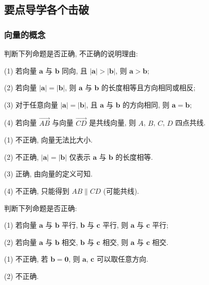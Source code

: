 \subsection{要点导学\quad 各个击破}
\subsubsection{向量的概念}
\begin{example}
    判断下列命题是否正确, 不正确的说明理由:
    
    (1) 若向量 $\bm{a}$ 与 $\bm{b}$ 同向, 且 $|\bm{a}|>|\bm{b}|$, 则 $\bm{a}>\bm{b}$;
    
    (2) 若向量 $|\bm{a}|=|\bm{b}|$, 则 $\bm{a}$ 与 $\bm{b}$ 的长度相等且方向相同或相反;
    
    (3) 对于任意向量 $|\bm{a}|=|\bm{b}|$, 且 $\bm{a}$ 与 $\bm{b}$ 的方向相同, 则 $\bm{a}=\bm{b}$;
    
    (4) 若向量 $\overrightarrow{AB}$ 与向量 $\overrightarrow{CD}$ 是共线向量, 则 $A$, $B$, $C$, $D$ 四点共线.
\end{example}
\beginsolution
    (1) 不正确, 向量无法比大小.

    (2) 不正确, $|\bm{a}|=|\bm{b}|$ 仅表示 $\bm{a}$ 与 $\bm{b}$ 的长度相等.

    (3) 正确, 由向量的定义可知.

    (4) 不正确, 只能得到 $AB\parallel CD$ (可能共线).
\endsolution

\lianxi
\begin{exercise}[s]
    判断下列命题是否正确:
    
    (1) 若向量 $\bm{a}$ 与 $\bm{b}$ 平行, $\bm{b}$ 与 $\bm{c}$ 平行, 
    则 $\bm{a}$ 与 $\bm{c}$ 平行;
    
    (2) 若向量 $\bm{a}$ 与 $\bm{b}$ 相交, $\bm{b}$ 与 $\bm{c}$ 相交, 
    则 $\bm{a}$ 与 $\bm{c}$ 相交.
\end{exercise}
\beginsolution
    (1) 不正确, 若 $\bm{b}= \bm{0}$, 则 $\bm{a}$, $\bm{c}$ 可以取任意方向.

    (2) 不正确.
\endsolution

